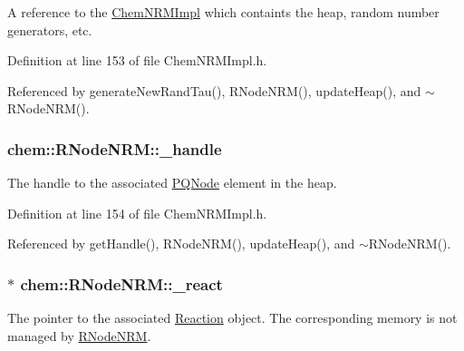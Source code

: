A reference to the \hyperlink{classchem_1_1ChemNRMImpl}{Chem\-N\-R\-M\-Impl} which containts the heap, random number generators, etc. 



Definition at line 153 of file Chem\-N\-R\-M\-Impl.\-h.



Referenced by generate\-New\-Rand\-Tau(), R\-Node\-N\-R\-M(), update\-Heap(), and $\sim$\-R\-Node\-N\-R\-M().

\hypertarget{classchem_1_1RNodeNRM_ad124c85b0f1b479cf0c1f4bf75230c19}{
\subsubsection[{\-\_\-handle}]{ {\bf chem\-::\-R\-Node\-N\-R\-M\-::\-\_\-handle}}}\label{classchem_1_1RNodeNRM_ad124c85b0f1b479cf0c1f4bf75230c19}


The handle to the associated \hyperlink{classchem_1_1PQNode}{P\-Q\-Node} element in the heap. 



Definition at line 154 of file Chem\-N\-R\-M\-Impl.\-h.



Referenced by get\-Handle(), R\-Node\-N\-R\-M(), update\-Heap(), and $\sim$\-R\-Node\-N\-R\-M().

\hypertarget{classchem_1_1RNodeNRM_a2430f6bd22239fc5b629bca05f9d34a8}{
\subsubsection[{\-\_\-react}]{$\ast$ {\bf chem\-::\-R\-Node\-N\-R\-M\-::\-\_\-react}}}\label{classchem_1_1RNodeNRM_a2430f6bd22239fc5b629bca05f9d34a8}


The pointer to the associated \hyperlink{classchem_1_1Reaction}{Reaction} object. The corresponding memory is not managed by \hyperlink{classchem_1_1RNodeNRM}{R\-Node\-N\-R\-M}. 



